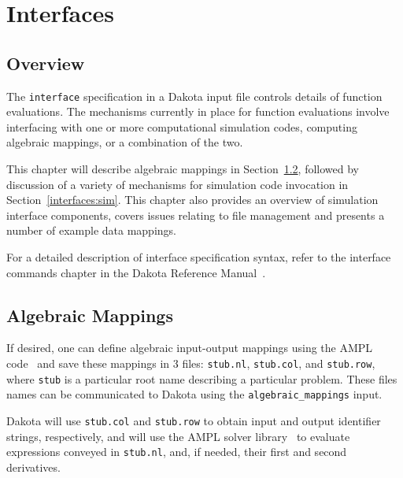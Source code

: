 \chapter{Interfaces}\label{interfaces}

\section{Overview}\label{interfaces:overview}

The \texttt{interface} specification in a Dakota input file controls
details of function evaluations. The mechanisms currently
in place for function evaluations involve interfacing with
one or more computational simulation codes, computing algebraic
mappings, or a combination of the two.


This chapter will describe algebraic mappings in
Section~\ref{interfaces:algebraic}, followed by discussion of a
variety of mechanisms for simulation code invocation in
Section~\ref{interfaces:sim}.  This chapter also provides an overview of
simulation interface components, covers issues relating to file
management and presents a number of example data mappings.

For a detailed description of interface specification syntax, refer to
the interface commands chapter in the Dakota Reference Manual~\cite{RefMan}.

\section{Algebraic Mappings}\label{interfaces:algebraic}

If desired, one can define algebraic input-output mappings using the
AMPL code~\cite{Fou03} and save these mappings in 3 files:
\texttt{stub.nl}, \texttt{stub.col}, and \texttt{stub.row}, where
\texttt{stub} is a particular root name describing a particular
problem.  These files names can be communicated to Dakota using the
\texttt{algebraic\_mappings} input.

Dakota will use \texttt{stub.col} and \texttt{stub.row} to obtain
input and output identifier strings, respectively, and will use the
AMPL solver library~\cite{Gay97} to evaluate expressions conveyed
in \texttt{stub.nl}, and, if needed, their first and second
derivatives.

